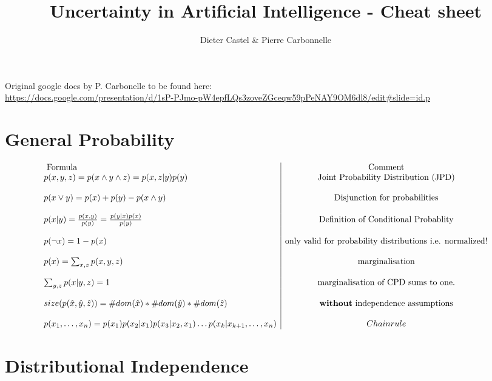\documentclass[a4paper,10pt]{article}
\title{Uncertainty in Artificial Intelligence - Cheat sheet}
\author{Dieter Castel \& Pierre Carbonnelle}
\begin{document}
\maketitle

Original google docs by P. Carbonelle to be found here:\\ \url{https://docs.google.com/presentation/d/1sP-PJmo-pW4epfLQs3zoveZGceqw59pPeNAY9OM6dl8/edit#slide=id.p}

\section{General Probability}

$$\begin{array}{l|c}
    \textrm{ Formula} & \textrm{Comment}  \\ 
    p(x,y,z) = p(x \wedge y \wedge z) = p(x,z|y)p(y) & \textrm{Joint Probability Distribution (JPD)}\\
    \\
    p(x \vee y) = p(x) + p(y) - p(x \wedge y) & \textrm{Disjunction for probabilities} \\
    \\
    p(x|y) = \frac{p(x,y)}{p(y)} = \frac{p(y|x)p(x)}{p(y)} & \textrm{Definition of Conditional Probablity}\\
    \\
    p(\neg x) = 1-p(x) & \textrm{only valid for probability distributions i.e. normalized!} \\
    \\
    p(x) = \sum_{x,z} p(x,y,z) & \textrm{marginalisation} \\
    \\
    \sum_{y,z} p(x|y,z) = 1 & \textrm{marginalisation of CPD sums to one.} \\
    \\
    size(p(\hat{x},\hat{y},\hat{z})) = \#dom(\hat{x})*\#dom(\hat{y})*\#dom(\hat{z}) & \textrm{\textbf{without} independence assumptions} \\
    \\
    p(x_1,\ldots,x_n) = p(x_1)p(x_2|x_1)p(x_3|x_2,x_1) \ldots p(x_k|x_{k+1},\ldots,x_{n}) & Chain rule  \\ 
  \end{array}
$$

\section{Distributional Independence}
\end{document}
